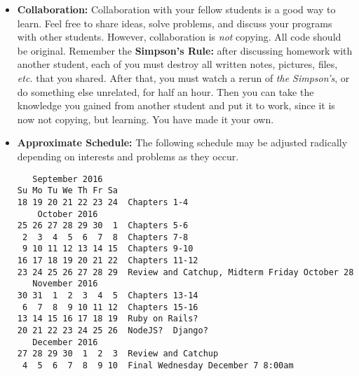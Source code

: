 \documentclass{article}
\begin{document}
\begin{itemize}
\item {\bf Collaboration:} Collaboration with your fellow students is
  a good way to learn.  Feel free to share ideas, solve problems, and
  discuss your programs with other students.  However, collaboration
  is {\em not} copying.  All code should be original.  Remember the
  {\bf Simpson's Rule:} after discussing homework with another
  student, each of you must destroy all written notes, pictures,
  files, {\em etc.} that you shared.  After that, you must watch a
  rerun of {\em the Simpson's}, or do something else unrelated, for
  half an hour.  Then you can take the knowledge you gained from
  another student and put it to work, since it is now not copying, but
  learning.  You have made it your own.

\item
{\bf Approximate Schedule:} The following schedule may be adjusted
radically depending on interests and problems as they occur.  


\begin{verbatim}
   September 2016     
Su Mo Tu We Th Fr Sa  
18 19 20 21 22 23 24  Chapters 1-4
    October 2016      
25 26 27 28 29 30  1  Chapters 5-6
 2  3  4  5  6  7  8  Chapters 7-8
 9 10 11 12 13 14 15  Chapters 9-10
16 17 18 19 20 21 22  Chapters 11-12
23 24 25 26 27 28 29  Review and Catchup, Midterm Friday October 28
   November 2016      
30 31  1  2  3  4  5  Chapters 13-14
 6  7  8  9 10 11 12  Chapters 15-16
13 14 15 16 17 18 19  Ruby on Rails?
20 21 22 23 24 25 26  NodeJS?  Django?
   December 2016      
27 28 29 30  1  2  3  Review and Catchup
 4  5  6  7  8  9 10  Final Wednesday December 7 8:00am
\end{verbatim}
\end{itemize}
\end{document}

